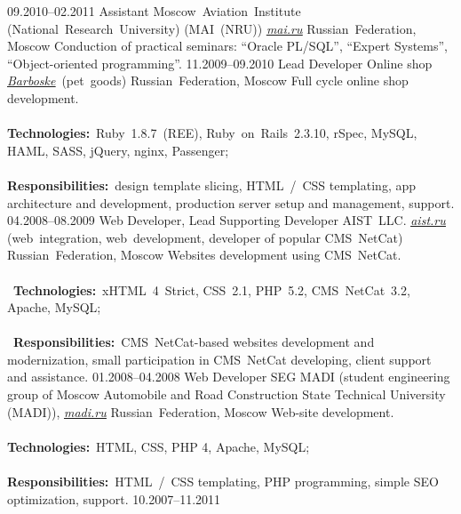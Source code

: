 \documentclass[12pt,a4paper,final]{moderncv}
\begin{document}
%
\cventry
{09.2010--02.2011}
{Assistant}
{Moscow~Aviation~Institute (National~Research~University) (MAI~(NRU)) \underline{\href{http://mai.ru}{\itshape mai.ru}}}
{Russian~Federation, Moscow}
{}
{
  Conduction of practical seminars: ``Oracle PL/SQL'', ``Expert Systems'', ``Object-oriented programming''.
}
%
\cventry
{11.2009--09.2010}
{Lead Developer}
{Online shop \underline{\href{http://barboske.ru}{\itshape Barboske}}~(pet~goods)}
{Russian~Federation, Moscow}
{}
{
  Full cycle online shop development.
  \\\\
  \textbf{Technologies:}~Ruby~1.8.7~(REE), Ruby~on~Rails~2.3.10, rSpec, MySQL, HAML, SASS, jQuery, nginx, Passenger;
  \\\\
  \textbf{Responsibilities:}~design template slicing, HTML~/~CSS templating, app architecture and development, production server setup and management, support.
}
%
\cventry
{04.2008--08.2009}
{Web Developer, Lead Supporting Developer}
{
  AIST~LLC. \underline{\href{http://aist.ru}{\itshape aist.ru}} (web~integration, web~development, developer of popular CMS~NetCat)
}
{Russian~Federation, Moscow}
{}
{
Websites development using CMS~NetCat.\\\\\
\textbf{Technologies:}~xHTML~4~Strict, CSS~2.1, PHP~5.2, CMS~NetCat~3.2, Apache, MySQL;\\\\\
\textbf{Responsibilities:}~CMS~NetCat-based websites development and modernization, small participation in CMS~NetCat developing, client support and assistance.
}
%
\cventry
{01.2008--04.2008}
{Web Developer}
{
  SEG MADI (student engineering group of Moscow Automobile and Road Construction State Technical University (MADI)), \underline{\href{http://madi.ru}{\itshape madi.ru}}
}
{Russian~Federation, Moscow}
{}
{
  Web-site development.\\\\
  \textbf{Technologies:}~HTML, CSS, PHP 4, Apache, MySQL;\\\\
  \textbf{Responsibilities:}~HTML~/~CSS templating, PHP programming, simple SEO optimization, support.
}
%
\cventry
{10.2007--11.2011}
\end{document}

